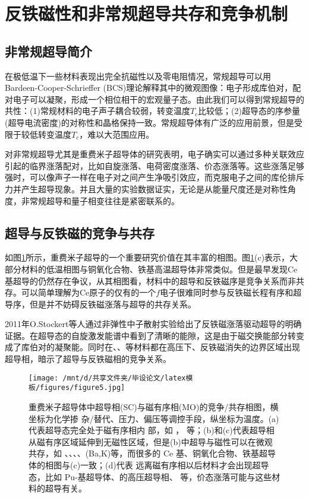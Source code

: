 \section{反铁磁性和非常规超导共存和竞争机制}%
\subsection{非常规超导简介}
在极低温下一些材料表现出完全抗磁性以及零电阻情况，常规超导可以用\\Bardeen-Cooper-Schrieffer (BCS)理论解释其中的微观图像：电子形成库伯对，配对电子可以凝聚，形成一个相位相干的宏观量子态。由此我们可以得到常规超导的共性：(1)常规材料的电子声子耦合较弱，转变温度$T_c$比较低；(2)超导态的序参量(超导电流密度)的对称性和晶格保持一致。常规超导体有广泛的应用前景，但是受限于较低转变温度$T_c$，难以大范围应用。

对非常规超导尤其是重费米子超导体的研究表明，电子确实可以通过多种关联效应引起的临界涨落配对，比如自旋涨落、电荷密度涨落、价态涨落等。这些涨落足够强时，可以像声子一样在电子对之间产生净吸引效应，而克服电子之间的库伦排斥力并产生超导现象。并且大量的实验数据证实，无论是从能量尺度还是对称性角度，非常规超导和量子相变往往是紧密联系的。
\subsection{超导与反铁磁的竞争与共存}
如图\ref{fig3}所示，重费米子超导的一个重要研究价值在其丰富的相图。图\ref{fig3}(c)表示，大部分材料的低温相图与铜氧化合物、铁基高温超导体非常类似。但是最早发现Ce基超导的仍然存在争议，从其相图看，材料中的超导和反铁磁序是竞争关系而非共存。可以简单理解为Ce原子的仅有的一个$f$电子很难同时参与反铁磁长程有序和超导序，但是并不妨碍反铁磁涨落与超导的共存关系。

2011年O.Stockert等人通过非弹性中子散射实验给出了反铁磁涨落驱动超导的明确证据。在超导态的自旋激发能谱中看到了清晰的能隙，这是由于磁交换能部分转变成了库伯对的凝聚能。同时在、、等材料都在高压下、反铁磁消失的边界区域出现超导相，暗示了超导与反铁磁相的竞争关系。



\begin{figure}[h]
    \texttt{[image: /mnt/d/共享文件夹/毕设论文/latex模板/figures/figure5.jpg]}
    \caption{重费米子超导体中超导相(SC)与磁有序相(MO)的竞争/共存相图，横坐标为化学掺 杂/替代、压力、偏压等调控手段，纵坐标为温度。(a)代表超导态完全处于磁有序相内 部，如 ， 等；(b)和(c)代表超导相从磁有序区域延伸到无磁性区域，但是(b)中超导与磁性可以在微观共存，如 、、、、(Ba,K)等，而很多的 Ce 基、铜氧化合物、铁基超导体的相图与(c)一致；(d)代表 远离磁有序相以后材料才会出现超导态，比如 Pu-基超导体、的高压超导相、 等，价态涨落可能与这些材料的超导有关\cite{9}。}
    \label{fig3}
\end{figure}

